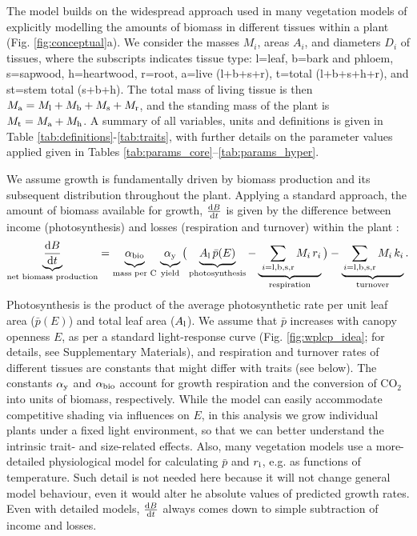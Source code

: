 \documentclass[a4paper,11pt]{article}
\begin{document}
The {\plant} model builds on the widespread approach used in many vegetation models of explicitly modelling the amounts of biomass in different tissues within a plant \citep[e.g.][]{Givnish-1988, Makela-1997, Moorcroft-2001, Sitch-2008, Falster-2011, King-2011, DeKauwe-2014} (Fig. \ref{fig:conceptual}a). We consider the masses $M_i$, areas $A_i$, and diameters $D_i$ of tissues, where the subscripts indicates tissue type: l=leaf, b=bark and phloem, s=sapwood, h=heartwood, r=root, a=live (l+b+s+r), t=total (l+b+s+h+r), and st=stem total (s+b+h). The total mass of living tissue is then $M_{\rm a}=M_{\rm l}+M_{\rm b}+M_{\rm s}+M_{\rm r}$, and the standing mass of the plant is $M_{\rm t}=M_{\rm a}+M_{\rm h}$. A summary of all variables, units and definitions is given in Table \ref{tab:definitions}-\ref{tab:traits}, with further details on the parameter values applied given in Tables \ref{tab:params_core}--\ref{tab:params_hyper}.

We assume growth is fundamentally driven by biomass production and its subsequent distribution throughout the plant. Applying a standard approach, the amount of biomass available for growth, $\frac{{\rm d}B}{{\rm d}t}$ is given by the difference between income (photosynthesis) and losses (respiration and turnover) within the plant \citep{Makela-1997, Thornley-2000}:
\begin{equation}\label{eq:dbdt}
\underbrace{\strut \frac{{\rm d}B}{{\rm d}t}}_\textrm{net biomass production}
= \underbrace{\strut \alpha_{\rm bio} }_\textrm{mass per C} \,
\underbrace{\strut \alpha_{\rm y} }_\textrm{yield}
\big( \underbrace{\strut A_{\rm l} \, \bar{p}(E)}_\textrm{photosynthesis} -
\underbrace{\strut \, \sum_{i = {\rm l}, {\rm b}, {\rm s}, {\rm r}}{M_i \, r_i}}_\textrm{respiration}\big)
- \underbrace{\strut \sum_{i = {\rm l}, {\rm b}, {\rm s},  {\rm r}}{M_i \, k_i}}_\textrm{turnover}.
\end{equation}
Photosynthesis is the product of the average photosynthetic rate per unit leaf area ($\bar{p}(E)$) and total leaf area ($A_{\rm l}$). We assume that $\bar{p}$ increases with canopy openness $E$, as per a standard light-response curve (Fig. \ref{fig:wplcp_idea}; for details, see Supplementary Materials), and respiration and turnover rates of different tissues are constants that might differ with traits (see below). The constants $\alpha_{\rm y}$ and $\alpha_{\rm bio}$ account for growth respiration and the conversion of CO$_2$ into units of biomass, respectively. While the {\plant} model can easily accommodate competitive shading via influences on $E$, in this analysis we grow individual plants under a fixed light environment, so that we can better understand the intrinsic trait- and size-related effects. Also, many vegetation models use a more-detailed physiological model for calculating $\bar{p}$ and $r_{\rm i}$, e.g. as functions of temperature. Such detail is not needed here because it will not change general model behaviour, even it would alter  he absolute values of predicted growth rates. Even with detailed models, $\frac{{\rm d}B}{{\rm d}t}$ always comes down to simple subtraction of income and losses.
\end{document}
